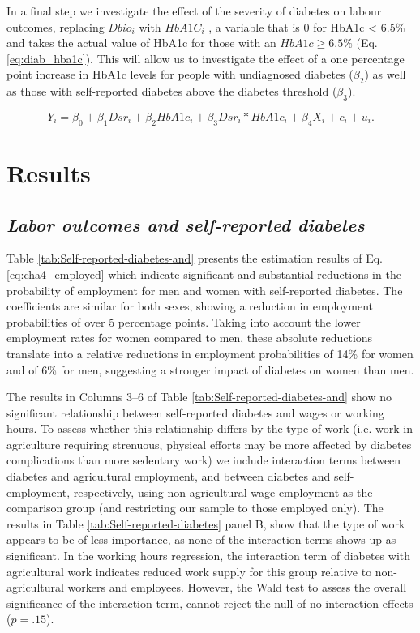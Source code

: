 \documentclass[12pt,english]{article}
\begin{document}
In a final step we investigate the effect of the severity of diabetes on labour outcomes,
replacing $Dbio_{i}$ with $HbA1C_{i}$ , a variable that is 0 for HbA1c < 6.5\% and takes the actual
value of \ac{HbA1c} for those with an $HbA1c \geq 6.5\%$ (Eq. \ref{eq:diab_hba1c}). This will allow us to investigate
the effect of a one percentage point increase in \ac{HbA1c} levels for people with undiagnosed
diabetes ($\beta_{2}$) as well as those with self-reported diabetes above the diabetes threshold
($\beta_{3}$).

\begin{equation}
Y_{i}=\beta_{0}+\beta_{1}Dsr_{i}+\beta_{2}HbA1c_{i}+\beta_{3}Dsr_{i}*HbA1c_{i}+\beta_{4}X_{i}+c_{i}+u_{i}.\label{eq:diab_hba1c}
\end{equation}

\section{\label{sec:cha_4_results}Results}


\subsection{\textit{Labor outcomes and self-reported diabetes}}

Table \ref{tab:Self-reported-diabetes-and} presents the estimation results of Eq. \ref{eq:cha4_employed} which indicate significant and substantial reductions in the probability of employment for men and women with self-reported diabetes. The coefficients are similar for both sexes, showing a reduction in employment probabilities of over 5 percentage points. Taking into account the lower employment rates for women compared to men, these absolute reductions translate into a relative reductions in employment probabilities of 14\% for women and of 6\% for men, suggesting a stronger impact of diabetes on women than men.

The results in Columns 3--6 of Table \ref{tab:Self-reported-diabetes-and} show no significant relationship between self-reported diabetes and wages or working hours. To assess whether this relationship differs by the type of work (i.e. work in agriculture requiring strenuous, physical efforts may be more affected by diabetes complications than more sedentary work) we include interaction terms between diabetes and agricultural employment, and between diabetes and self-employment, respectively, using non-agricultural wage employment as the comparison group (and restricting our sample to those employed only). The results in Table \ref{tab:Self-reported-diabetes} panel B, show that the type of work appears to be of less importance, as none of the interaction terms shows up as significant. In the working hours regression, the interaction term of diabetes with agricultural work indicates reduced work supply for this group relative to non-agricultural workers and employees. However, the Wald test to assess the overall significance of the interaction term, cannot  reject the null of no interaction effects ($p = .15$).
\end{document}
